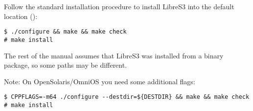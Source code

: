 Follow the standard installation procedure to install
LibreS3 into the default location ():

\begin{lstlisting}
$ ./configure && make && make check
# make install
\end{lstlisting}
The rest of the manual assumes that LibreS3 was installed from a binary
package, so some paths may be different.

Note: On OpenSolaris/OmniOS you need some additional flags:
\begin{lstlisting}
$ CPPFLAGS=-m64 ./configure --destdir=${DESTDIR} && make && make check
# make install
\end{lstlisting}
